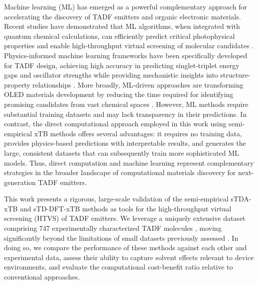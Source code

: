 \documentclass[journal=jcisd8,manuscript=article,keywords=true]{achemso}
\begin{document}
Machine learning (ML) has emerged as a powerful complementary approach for accelerating the discovery of TADF emitters and organic electronic materials. Recent studies have demonstrated that ML algorithms, when integrated with quantum chemical calculations, can efficiently predict critical photophysical properties and enable high-throughput virtual screening of molecular candidates \cite{ML_xTB_MaterialsScreening2022}. Physics-informed machine learning frameworks have been specifically developed for TADF design, achieving high accuracy in predicting singlet-triplet energy gaps and oscillator strengths while providing mechanistic insights into structure-property relationships \cite{PhysicsGuidedML_TADF2024}. More broadly, ML-driven approaches are transforming OLED materials development by reducing the time required for identifying promising candidates from vast chemical spaces \cite{Abroshan2022ML_OLED}. However, ML methods require substantial training datasets and may lack transparency in their predictions. In contrast, the direct computational approach employed in this work using semi-empirical xTB methods offers several advantages: it requires no training data, provides physics-based predictions with interpretable results, and generates the large, consistent datasets that can subsequently train more sophisticated ML models. Thus, direct computation and machine learning represent complementary strategies in the broader landscape of computational materials discovery for next-generation TADF emitters.

This work presents a rigorous, large-scale validation of the semi-empirical sTDA-xTB and
sTD-DFT-xTB methods as tools for the high-throughput virtual screening (HTVS) of TADF
emitters. We leverage a uniquely extensive dataset comprising \num{747} experimentally
characterized TADF molecules \cite{Huang_2024}, moving significantly beyond the
limitations of small datasets previously assessed
\cite{Moral2015, deSilva2019TADF}. In doing so, we compare the performance of
these methods against each other and experimental data, assess their ability to capture
solvent effects relevant to device environments, and evaluate the computational
cost-benefit ratio relative to conventional approaches.
\end{document}
